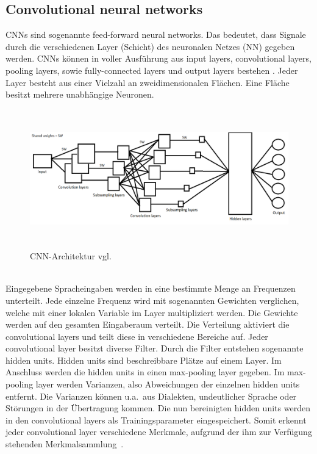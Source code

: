 \subsection{Convolutional neural networks}
CNNs sind sogenannte feed-forward neural networks. Das bedeutet, dass Signale durch die verschiedenen Layer (Schicht) des neuronalen Netzes (NN) gegeben werden. CNNs können in voller Ausführung aus input layers, convolutional layers, pooling layers, sowie fully-connected layers und output layers bestehen \cite{facialemotionrecusingcnn}. Jeder Layer besteht aus einer Vielzahl an zweidimensionalen Flächen. Eine Fläche besitzt mehrere unabhängige Neuronen.
\\
\begin{figure}[h]
\includegraphics[width=\linewidth, height=6cm]{Bilder/CNN/CNNArchitektur.png}
\caption{CNN-Architektur vgl. \cite{noisycnn}}
\end{figure}
\\
Eingegebene Spracheingaben werden in eine bestimmte Menge an Frequenzen unterteilt. Jede einzelne Frequenz wird mit sogenannten Gewichten verglichen, welche mit einer lokalen Variable im Layer multipliziert werden. Die Gewichte werden auf den gesamten Eingaberaum verteilt. Die Verteilung aktiviert die convolutional layers und teilt diese in verschiedene Bereiche auf. Jeder convolutional layer besitzt diverse Filter. Durch die Filter entstehen sogenannte hidden units. Hidden units sind beschreibbare Plätze auf einem Layer. Im Anschluss werden die hidden units in einen max-pooling layer gegeben. Im max-pooling layer werden Varianzen, also Abweichungen der einzelnen hidden units entfernt. Die Varianzen können u.a.~aus Dialekten, undeutlicher Sprache oder Störungen in der Übertragung kommen. Die nun bereinigten hidden units werden in den convolutional layers als Trainingsparameter eingespeichert. Somit erkennt jeder convolutional layer verschiedene Merkmale, aufgrund der ihm zur Verfügung stehenden Merkmalsammlung~\cite{usingcnn}.